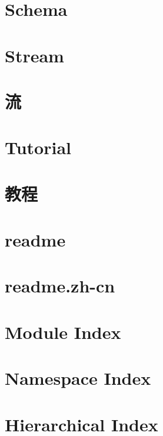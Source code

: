 \documentclass[twoside]{book}
\newcommand{\+}{\discretionary{\mbox{\scriptsize$\hookleftarrow$}}{}{}}
\begin{document}
\chapter{Schema}
\label{md_src_rapidjson_doc_schema_zh_cn}

\chapter{Stream}
\label{md_src_rapidjson_doc_stream}

\chapter{流}
\label{md_src_rapidjson_doc_stream_zh_cn}

\chapter{Tutorial}
\label{md_src_rapidjson_doc_tutorial}

\chapter{教程}
\label{md_src_rapidjson_doc_tutorial_zh_cn}

\chapter{readme}
\label{md_src_rapidjson_readme}

\chapter{readme.\+zh-\/cn}
\label{md_src_rapidjson_readme_zh_cn}

\chapter{Module Index}

\chapter{Namespace Index}

\chapter{Hierarchical Index}

\end{document}

